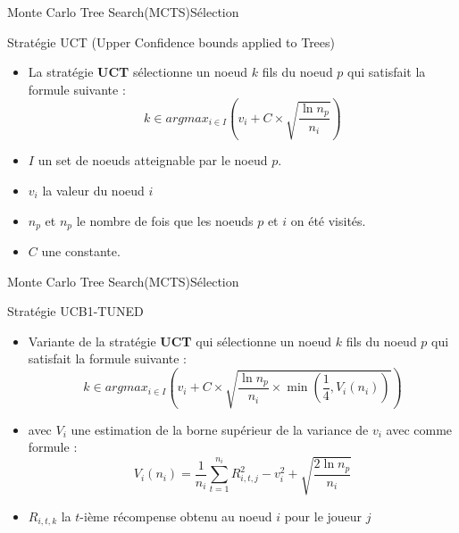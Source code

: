 \begin{frame}{Monte Carlo Tree Search(MCTS)}{Sélection}
	\begin{block}{Stratégie UCT (Upper Confidence bounds applied to Trees)}
		\begin{itemize}
			\item La stratégie \textbf{UCT} sélectionne un noeud $k$ fils du noeud $p$ qui satisfait la formule suivante :
			      $$k \in argmax_{i\in I}\left(v_{i} + C \times \sqrt{\frac{\ln n_{p}}{n_{i}}}\right)$$
			\item $I$ un set de noeuds atteignable par le noeud $p$.
			\item $v_{i}$ la valeur du noeud $i$
			\item $n_{p}$ et $n_{p}$ le nombre de fois que les noeuds $p$ et $i$ on été visités.
			\item $C$ une constante.
		\end{itemize}
	\end{block}
\end{frame}

\begin{frame}{Monte Carlo Tree Search(MCTS)}{Sélection}
	\begin{block}{Stratégie UCB1-TUNED}
		\begin{itemize}
			\item Variante de la stratégie \textbf{UCT} qui sélectionne un noeud $k$ fils du noeud $p$ qui satisfait la formule suivante :
			      $$k \in argmax_{i\in I}\left(v_{i} + C \times \sqrt{\frac{\ln n_{p}}{n_{i}}\times \min(\frac{1}{4}, V_{i}(n_{i}))}\right)$$
			\item avec $V_{i}$ une estimation de la borne supérieur de la variance de $v_{i}$ avec comme formule :
			      $$V_{i}(n_{i}) = \frac{1}{n_{i}}\sum_{t=1}^{n_{i}}R_{i,t,j}^2 - v_{i}^2 + \sqrt{\frac{2\ln n_{p}}{n_{i}}}$$
			\item $R_{i,t,k}$ la $t$-ième récompense obtenu au noeud $i$ pour le joueur $j$
		\end{itemize}
	\end{block}
\end{frame}

